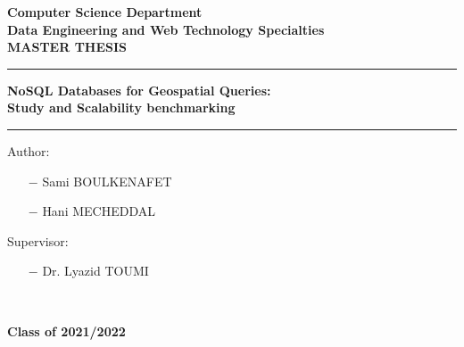 \begin{titlepage}
  \begin{center}
    \textbf{\large{Computer Science Department}}
    \vspace{0.2cm}
    \\
    \textbf{\large{Data Engineering and Web Technology Specialties}}
    \vspace{1cm}
    \\
    \textbf{\large\uppercase{Master Thesis}}
  \end{center}
  \begin{center}
    \color{cyan}\rule{0.7\textwidth}{2pt}
  \end{center}
  \begin{center}
    \vspace{0.2cm}
    \textbf{\Large{NoSQL Databases for Geospatial Queries:}}
    \\
    \textbf{\Large{Study and Scalability benchmarking}
    }
    \vspace{0.2cm}
  \end{center}

  \begin{center}
    \color{cyan}\rule{0.7\textwidth}{2pt}
  \end{center}
  \vspace{1cm}
  \begin{center}
    \begin{minipage}[t]{0.4\textwidth}
      \begin{flushleft}
        \large{Author:}\\
        \begin{itemize}
          \item [$-$] \large{Sami BOULKENAFET}
          \item [$-$] \large{Hani MECHEDDAL}
        \end{itemize}
      \end{flushleft}
    \end{minipage}
    \begin{minipage}[t]{0.3\textwidth}
      \begin{flushleft}
        \large{Supervisor:} \\
        \begin{itemize}
          \item [$-$] \large{Dr. Lyazid TOUMI}
        \end{itemize}
      \end{flushleft}

    \end{minipage}\\[2cm]
  \end{center}
  \begin{center}
    \textbf{\Large{Class of 2021/2022}}
  \end{center}
\end{titlepage}
